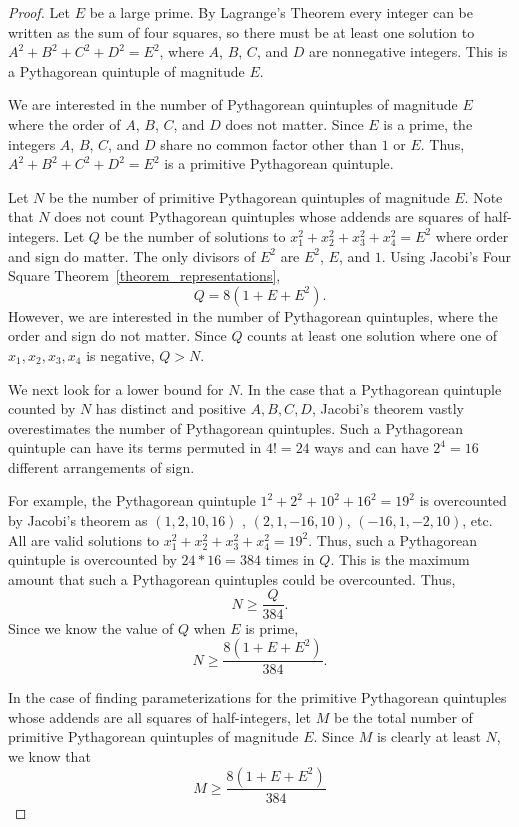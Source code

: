 \documentclass[12pt,table]{article}
\theoremstyle{definition}
\theoremstyle{remark}
\numberwithin{equation}{section}
\begin{document}
\begin{proof}
Let $E$ be a large prime. 
By Lagrange's Theorem every integer can be written as the sum of 
four squares, 
so
there must be at least one solution to
$A^2 + B^2 + C^2 + D^2 = E^2$, where $A$, $B$, $C$, and $D$ are
 nonnegative integers. This is a Pythagorean quintuple of magnitude $E$.


We are interested in the number of Pythagorean quintuples of magnitude
$E$
where the
order of $A$, $B$, $C$, and $D$ does not matter.  
Since $E$ is a prime,
the integers  $A$, $B$, $C$, and $D$ share no
common factor other than $1$ or $E$. 
Thus, $A^2 + B^2 + C^2 + D^2 = E^2$ is a primitive Pythagorean
quintuple. 


Let $N$ be the number of primitive
Pythagorean quintuples of magnitude $E$. Note that $N$ does not count
Pythagorean quintuples whose addends  are squares of  half-integers.
Let $Q$ be the number of solutions to 
$x_1^2 +  x_2^2 +  x_3^2 +  x_4^2 = E^2$
where order and sign do matter.
The only divisors of $E^2$ are
$E^2$, $E$, and $1$. Using 
Jacobi's Four Square Theorem~\ref{theorem_representations}, 
\[
     Q = 8(1 + E + E^2).
\]
However, we are interested in the number of Pythagorean quintuples,
where the order and sign do not matter. Since $Q$ counts at least one
solution where one of $x_1,x_2,x_3,x_4$ is negative, $Q > N$.



We next look for a lower bound for $N$.
In the case that a Pythagorean quintuple counted by $N$ 
has distinct and positive $A,B,C,D$,
Jacobi's theorem vastly  overestimates the number of
Pythagorean quintuples. 
Such a Pythagorean quintuple can have its terms  permuted in 
$4! = 24$ ways and can have $2^4 = 16$ different arrangements of sign.


For example, the Pythagorean quintuple
 $1^2 + 2^2 + 10^2 + 16^2 = 19^2$ is overcounted by
Jacobi's theorem as
$(1,2,10,16)$ , $(2,1,-16,10)$, $(-16,1,-2,10)$, etc.
All are valid solutions to
$x_1^2 +  x_2^2 +  x_3^2 +  x_4^2 = 19^2$.
Thus, such a Pythagorean quintuple
is overcounted by $24*16 = 384$ times in $Q$. 
This is the maximum amount that such a Pythagorean
quintuples could be overcounted.
Thus,
\[
     N \geq \frac{Q}{384}.
\] 
Since we know the value of $Q$ when $E$ is prime,
\[
     N \geq \frac{ 8(1+E+E^2) }{384}.
\] 

In the case of
finding parameterizations for the primitive Pythagorean
quintuples whose addends are all squares of half-integers,
let $M$ be the total  number of 
primitive Pythagorean quintuples of magnitude $E$. Since $M$ is clearly 
at least $N$, we know that 
\begin{equation}
\label{lower}
M \geq \frac{ 8(1+E+E^2) }{384}
\end{equation}


\end{proof}
\end{document}
